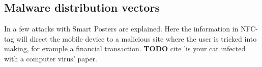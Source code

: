 

\subsection{Malware distribution vectors}
In \cite{10.1109/ARES.2009.46} a few attacks with Smart Posters are explained.
Here the information in NFC-tag will direct the mobile device to a malicious site where the user is tricked into making, for example a financial transaction.
\textbf{TODO} cite 'is your cat infected with a computer virus' paper.


